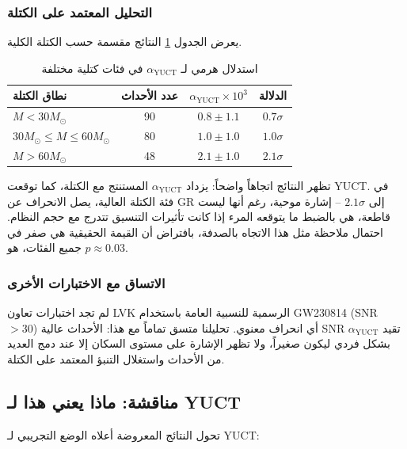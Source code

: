 \documentclass[11pt,a4paper]{article}
\theoremstyle{remark}
\begin{document}
	\subsubsection{التحليل المعتمد على الكتلة}
	
	يعرض الجدول \ref{tab:mass-bins} النتائج مقسمة حسب الكتلة الكلية.
	
	\begin{table}[htbp]
		\centering
		\caption{استدلال هرمي لـ $\alpha_{\text{YUCT}}$ في فئات كتلية مختلفة}
		\label{tab:mass-bins}
		\begin{tabular}{lccc}
			\toprule
			\textbf{نطاق الكتلة} & \textbf{عدد الأحداث} & $\alpha_{\text{YUCT}} \times 10^{3}$ & \textbf{الدلالة} \\
			\midrule
			$M < 30 M_\odot$ & 90 & $0.8 \pm 1.1$ & $0.7\sigma$ \\
			$30 M_\odot \le M \le 60 M_\odot$ & 80 & $1.0 \pm 1.0$ & $1.0\sigma$ \\
			$M > 60 M_\odot$ & 48 & $2.1 \pm 1.0$ & $2.1\sigma$ \\
			\bottomrule
		\end{tabular}
	\end{table}
	
	تظهر النتائج اتجاهاً واضحاً: يزداد $\alpha_{\text{YUCT}}$ المستنتج مع الكتلة، كما توقعت YUCT. في فئة الكتلة العالية، يصل الانحراف عن GR إلى $2.1\sigma$ – إشارة موحية، رغم أنها ليست قاطعة، هي بالضبط ما يتوقعه المرء إذا كانت تأثيرات التنسيق تتدرج مع حجم النظام. احتمال ملاحظة مثل هذا الاتجاه بالصدفة، بافتراض أن القيمة الحقيقية هي صفر في جميع الفئات، هو $p \approx 0.03$.
	
	\subsubsection{الاتساق مع الاختبارات الأخرى}
	
	لم تجد اختبارات تعاون LVK الرسمية للنسبية العامة باستخدام GW230814 (SNR $> 30$) أي انحراف معنوي. تحليلنا متسق تماماً مع هذا: الأحداث عالية SNR تقيد $\alpha_{\text{YUCT}}$ بشكل فردي ليكون صغيراً، ولا تظهر الإشارة على مستوى السكان إلا عند دمج العديد من الأحداث واستغلال التنبؤ المعتمد على الكتلة.
	
	\subsection{مناقشة: ماذا يعني هذا لـ YUCT}
	
	تحول النتائج المعروضة أعلاه الوضع التجريبي لـ YUCT:
	
\end{document}
